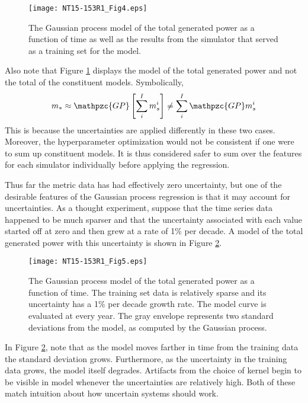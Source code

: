 \documentclass{ntmanuscript}
\newcommand{\GP}{\mathpzc{GP}}
\begin{document}
\begin{figure}[htb]
\centering
\texttt{[image: NT15-153R1\_Fig4.eps]}
\caption{The Gaussian process model of the total generated power
as a function of time as well as the results from the simulator that served as a
training set for the model.}
\label{gwe-model-total}
\end{figure}

\clearpage

Also note that Figure \ref{gwe-model-total} displays the model of the total
generated power and not the total of the constituent models. Symbolically,
\begin{equation}
\label{total-model}
m_* \approx \GP \left[\sum_i^I m_s^i\right] \ne \sum_i^I \GP m_s^i
\end{equation}
This is because the uncertainties are applied differently in these two cases.
Moreover, the hyperparameter
optimization would not be consistent if one were to sum up constituent
models. It is thus considered safer
to sum over the features for each simulator individually before applying the
regression.

Thus far the metric data has had effectively zero uncertainty, but one of the
desirable features of the Gaussian process regression is that it may account
for uncertainties. As a thought experiment, suppose that the time
series data happened to be much sparser and that
the uncertainty associated with each value started off at zero and then grew at
a rate of 1\% per decade. A model of the total generated power with this uncertainty
is shown in Figure \ref{gwe-model-total-with-uncertainty}.

\begin{figure}[htb]
\centering
\texttt{[image: NT15-153R1\_Fig5.eps]}
\caption{The Gaussian process model of the total generated power
as a function of time. The training set data is relatively sparse and its uncertainty
has a 1\% per decade growth rate. The model curve is evaluated at every year. The
gray envelope represents two standard deviations from the model, as computed by
the Gaussian process.}
\label{gwe-model-total-with-uncertainty}
\end{figure}

In Figure \ref{gwe-model-total-with-uncertainty}, note that as the model moves
farther in time from the training data the standard deviation grows. Furthermore,
as the uncertainty in the training data grows, the model itself degrades. Artifacts
from the choice of kernel begin to be visible in model whenever the uncertainties are
relatively high. Both of these match intuition about how uncertain systems should
work.
\end{document}
